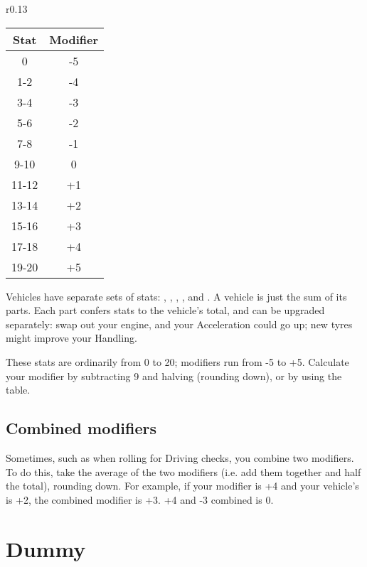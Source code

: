 \documentclass[10pt, a4paper, twocolumn]{article}
\begin{document}
\begin{wraptable}[12]{r}{0.13\textwidth}
\vspace*{-3ex}
\begin{tabular}{cc}
  Stat  & Modifier \\
  \hline 
  0     & -5       \\
  1-2   & -4       \\
  3-4   & -3       \\
  5-6   & -2       \\
  7-8   & -1       \\
  9-10  &  0       \\
  11-12 & +1       \\
  13-14 & +2       \\
  15-16 & +3       \\
  17-18 & +4       \\
  19-20 & +5
\end{tabular}
\vspace*{-10pt}
\end{wraptable}

Vehicles have separate sets of stats: , ,
, ,  and . A vehicle is just
the sum of its parts. Each part confers stats to the vehicle's total, and can be
upgraded separately: swap out your engine, and your Acceleration could go up;
new tyres might improve your Handling.

These stats are ordinarily from 0 to 20; modifiers
run from -5 to +5. Calculate your modifier by subtracting 9 and halving
(rounding down), or by using the table.

\subsection{Combined modifiers}
Sometimes, such as when rolling for Driving checks, you combine two
modifiers. To do this, take the average of the two modifiers (i.e. add them
together and half the total), rounding down. For example, if your 
modifier is +4 and your vehicle's  is +2, the combined modifier is +3. 
+4 and -3 combined is 0.


\section{Dummy}
\lipsum{}
\end{document}
